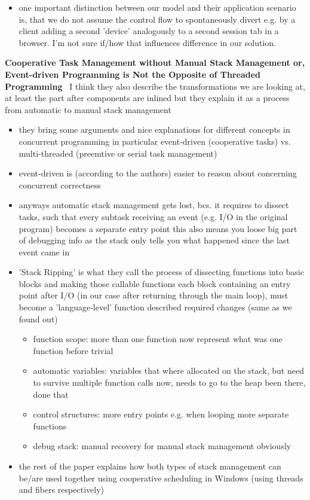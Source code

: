 \begin{itemize}
\begin{itemize}
    \end{itemize}
    \item one important distinction between our model and their application scenario is, that we do not assume the control flow to spontaneously divert e.g. by a client adding a second 'device' analogously to a second session tab in a browser. I'm not sure if/how that influences difference in our solution.
\end{itemize}


\textbf{Cooperative Task Management without Manual Stack Management
or, Event-driven Programming is Not the Opposite of Threaded Programming}~\cite{adya2002cooperative}
\means I think they also describe the transformations we are looking at, at least the part after components are inlined  but they explain it as a process from automatic to manual stack management
\begin{itemize}
    \item they bring some arguments and nice explanations for different concepts in
    concurrent programming in particular event-driven (cooperative tasks) vs. multi-threaded (preemtive or serial task management)
    \item event-driven is (according to the authors) easier to reason about concerning concurrent correctness
    \item anyways automatic stack management gets lost, bcs. it requires to dissect tasks, such that every subtask receiving an event (e.g. I/O in the original program) becomes a separate entry point \means this also means you loose big part of debugging info as the stack only tells you what happened since the last event came in
    \item 'Stack Ripping' is what they call the process of dissecting functions into basic blocks and making those callable functions \means each block containing an entry point after I/O (in our case after returning through the main loop), must become a 'language-level' function
    described required changes (same as we found out)
    \begin{itemize}
        \item function scope: more than one function now represent what was one function before \means trivial
        \item automatic variables: variables that where allocated on the stack, but need to survive multiple function calls now, needs to go to the heap \means been there, done that
        \item control structures: \means more entry points e.g. when looping \means more separate functions
        \item debug stack: manual recovery for manual stack management obviously
    \end{itemize}
    \item the rest of the paper explains how both types of stack management can be/are used together using cooperative scheduling in Windows (using threads and fibers respectively)
\end{itemize}

